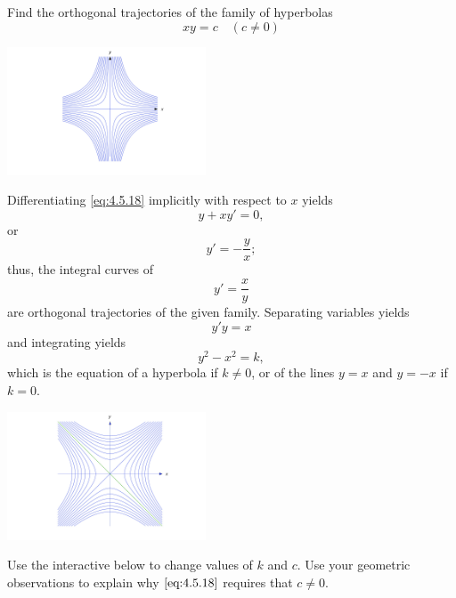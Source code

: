 \documentclass{ximera}
\begin{document}
\begin{example}\label{example:4.5.10}
Find the orthogonal trajectories of the family of hyperbolas
\begin{equation}  \label{eq:4.5.18}
xy=c \quad (c\ne0)
\end{equation}

\begin{image}
  \includegraphics[height=1.5in]{fig040507.jpg} 
\end{image}

\begin{explanation}
Differentiating \eqref{eq:4.5.18} implicitly with respect to $x$ yields
$$
y+xy'=0,
$$
or
$$
y'=-\frac{y}{x};
$$
 thus, the integral curves of
$$
y'=\frac{x}{y}
$$
are orthogonal trajectories of the given family. Separating variables
yields
$$
y'y=x
$$
and integrating yields
$$
y^2-x^2=k,
$$
which is the equation of a hyperbola if $k \neq 0$, or of the lines
$y=x$ and $y=-x$ if $k=0$.

\begin{image}
  \includegraphics[height=1.5in]{fig040512.jpg} 
\end{image}

Use the interactive below to change values of $k$ and $c$.  Use your geometric observations to explain why $\eqref{eq:4.5.18}$ requires that $c\neq 0$.


\end{explanation}
\end{example}
\end{document}
